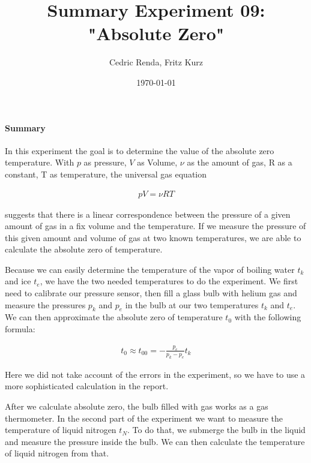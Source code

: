 \documentclass[12pt,a4paper]{article}
\title{Summary Experiment 09: "Absolute Zero"}
\author{Cedric Renda, Fritz Kurz}
\date{\today }
\begin{document}
	\maketitle


	\paragraph{Summary}
		In this experiment the goal is to determine the value of the absolute zero temperature. With $p$ as pressure, $V$ as Volume, $\nu$ as the amount of gas, R as a constant, T as temperature, the universal gas equation
		
			\begin{align}
				pV = \nu RT
			\end{align}
	
		 suggests that there is a linear correspondence between the pressure of a given amount of gas in a fix volume and the temperature. If we measure the pressure of this given amount and volume of gas at two known temperatures, we are able to calculate the absolute zero of temperature. 
		 
		 Because we can easily determine the temperature of the vapor of boiling water $t_k$ and ice $t_e$, we have the two needed temperatures to do the experiment. We first need to calibrate our pressure sensor, then fill a glass bulb with helium gas and measure the pressures $p_k$ and $p_e$ in the bulb at our two temperatures $t_k$ and $t_e$. We can then approximate the absolute zero of temperature $t_0$ with the following formula:
		 	
		 	\begin{align}
		 		t_0 \approx t_{00} = -\frac{p_e}{p_k - p_e}t_k
		 	\end{align}
	 	
		Here we did not take account of the errors in the experiment, so we have to use a more sophisticated calculation in the report. 
		
		After we calculate absolute zero, the bulb filled with gas works as a gas thermometer. In the second part of the experiment we want to measure the temperature of liquid nitrogen $t_N$. To do that, we submerge the bulb in the liquid and measure the pressure inside the bulb. We can then calculate the temperature of liquid nitrogen from that. 
\end{document}
